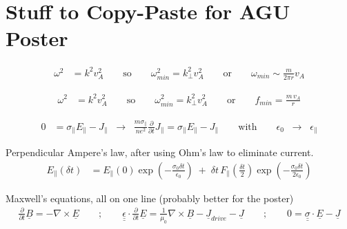 \documentclass{article}
\begin{document}
\section{Stuff to Copy-Paste for AGU Poster}



\begin{align*}
  \omega^2 & = k^2 v_A^2 \qquad
  \mathrm{so} \qquad 
  \omega_{min}^2 = k_\bot^2 v_A^2 \qquad
  \mathrm{or} \qquad
  \omega_{min} \sim \frac{m}{2 \pi r} v_A
\end{align*}


\begin{align*}
  \omega^2 & = k^2 v_A^2 \qquad
  \mathrm{so} \qquad 
  \omega_{min}^2 = k_\bot^2 v_A^2 \qquad
  \mathrm{or} \qquad
  f_{min} = \frac{m \, v_A}{r}
\end{align*}




\begin{align*}
  0 & = \sigma_\parallel E_\parallel - J_\parallel \;\;
  \rightarrow \;\;
  \frac{m \sigma_\parallel}{n e^2} \frac{\partial}{\partial t} J_\parallel = 
  \sigma_\parallel E_\parallel - J_\parallel \qquad
  \mathrm{with} \qquad
  \epsilon_0 \;\;
  \rightarrow \;\;
  \epsilon_\parallel
\end{align*}






Perpendicular Ampere’s law, after using Ohm’s law to eliminate current. 
\begin{align*}
  E_\parallel \! ( \delta t )& = 
    E_\parallel \! ( 0 ) \exp ( {\scriptstyle -\frac{\sigma_0 \delta t}{\epsilon_0} } ) \; +\;  
    \delta t \, 
    F_\parallel \! ( {\scriptstyle \frac{\delta t}{2} } ) 
    \exp ( {\scriptstyle -\frac{\sigma_0 \delta t}{2 \epsilon_0} } )
\end{align*}




Maxwell’s equations, all on one line (probably better for the poster)
\begin{align*}
  \frac{\partial}{\partial t} \underline{B} =
  - \nabla \times \underline{E} \qquad ; \qquad
  \underline{ \underline{\epsilon} } \cdot \frac{\partial}{\partial t} \underline{E} =
  \frac{1}{\mu_0} \nabla \times \underline{B} - 
  \underline{J}_{drive} - 
  \underline{J} \qquad ; \qquad
  0 =
  \underline{ \underline{\sigma} } \cdot \underline{E} - \underline{J}
\end{align*}
\end{document}
